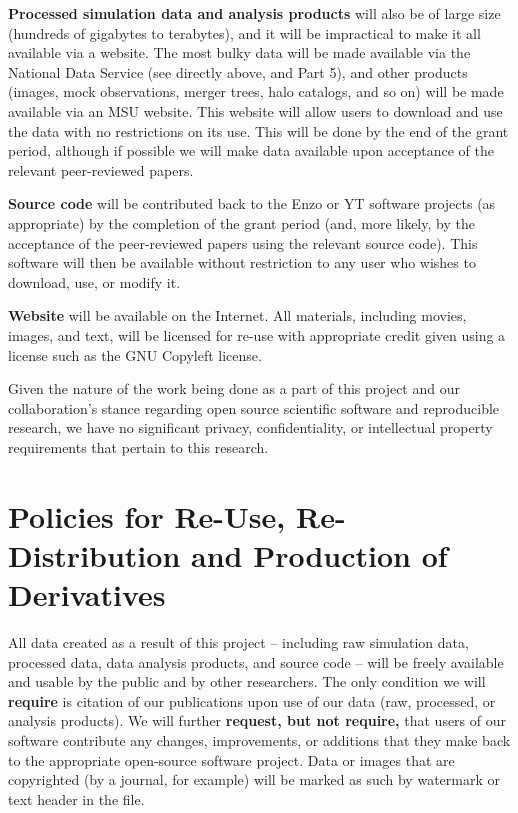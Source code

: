 \documentclass[11pt]{article}
\begin{document}
\noindent\textbf{Processed simulation data and analysis products} will
also be of large size (hundreds of gigabytes to terabytes), and it
will be impractical to make it all available via a website.  The most
bulky data will be made available via the National Data Service (see
directly above, and Part 5), and other products (images, mock
observations, merger trees, halo catalogs, and so on) will be made
available via an MSU website.  This website will allow users to
download and use the data with no restrictions on its use.  This will
be done by the end of the grant period, although if possible we will
make data available upon acceptance of the relevant peer-reviewed
papers.

\noindent\textbf{Source code} will be contributed back to the Enzo or YT software
projects (as appropriate) by the completion of the grant period (and,
more likely, by the acceptance of the peer-reviewed papers using the
relevant source code).  This software will then be available without
restriction to any user who wishes to download, use, or modify it.

\noindent\textbf{Website} will be available on the Internet.  All materials,
including movies, images, and text, will be licensed for re-use with
appropriate credit given using a license such as the GNU Copyleft
license.

Given the nature of the work being done as a part of this project and
our collaboration's stance regarding open source scientific software
and reproducible research, we have no significant privacy,
confidentiality, or intellectual property requirements that pertain to
this research.

\vspace{-3mm}
\section{Policies for Re-Use, Re-Distribution and Production of
  Derivatives}
\vspace{-3mm}

All data created as a result of this project – including raw
simulation data, processed data, data analysis products, and source
code – will be freely available and usable by the public and by other
researchers.  The only condition we will \textbf{require} is citation
of our publications upon use of our data (raw, processed, or analysis
products).  We will further \textbf{request, but not require,} that
users of our software contribute any changes, improvements, or
additions that they make back to the appropriate open-source software
project.  Data or images that are copyrighted (by a journal, for
example) will be marked as such by watermark or text header in the
file.
\end{document}
